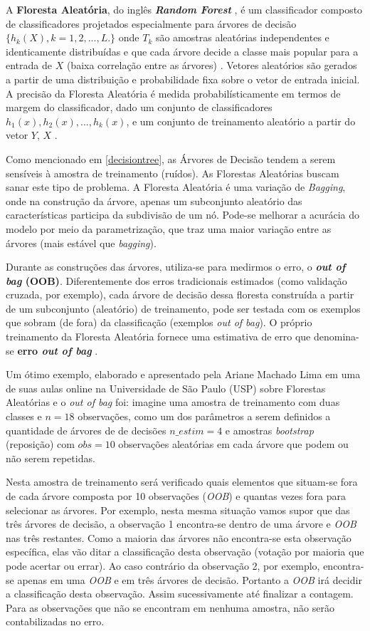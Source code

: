 \documentclass[
  openany]{book}
\begin{document}
A \textbf{Floresta Aleatória}, do inglês \textbf{\emph{Random Forest}} \citep{breiman2001random, liaw2002classification}, é um classificador composto de classificadores projetados especialmente para árvores de decisão \(\{h_k(X),k=1,2,...,L.\}\) onde \(T_k\) são amostras aleatórias independentes e identicamente distribuídas e que cada árvore decide a classe mais popular para a entrada de \(X\) (baixa correlação entre as árvores) . Vetores aleatórios são gerados a partir de uma distribuição e probabilidade fixa sobre o vetor de entrada inicial. A precisão da Floresta Aleatória é medida probabilísticamente em termos de margem do classificador, dado um conjunto de classificadores \(h_1(x), h_2(x),...,h_k(x)\), e um conjunto de treinamento aleatório a partir do vetor \(Y\), \(X\) \citep{gomez2012random}.

Como mencionado em \ref{decisiontree}, as Árvores de Decisão tendem a serem sensíveis à amostra de treinamento (ruídos). As Florestas Aleatórias buscam sanar este tipo de problema. A Floresta Aleatória é uma variação de \emph{Bagging}, onde na construção da árvore, apenas um subconjunto aleatório das características participa da subdivisão de um nó. Pode-se melhorar a acurácia do modelo por meio da parametrização, que traz uma maior variação entre as árvores (mais estável que \emph{bagging}).

Durante as construções das árvores, utiliza-se para medirmos o erro, o \textbf{\emph{out of bag} (OOB)}. Diferentemente dos erros tradicionais estimados (como validação cruzada, por exemplo), cada árvore de decisão dessa floresta construída a partir de um subconjunto (aleatório) de treinamento, pode ser testada com os exemplos que sobram (de fora) da classificação (exemplos \emph{out of bag}). O próprio treinamento da Floresta Aleatória fornece uma estimativa de erro que denomina-se \textbf{erro \emph{out of bag} }.

Um ótimo exemplo, elaborado e apresentado pela Ariane Machado Lima em uma de suas aulas online na Universidade de São Paulo (USP) sobre Florestas Aleatórias e o \emph{out of bag} foi: imagine uma amostra de treinamento com duas classes e \(n=18\) observações, como um dos parâmetros a serem definidos a quantidade de árvores de de decisões \(n\_estim=4\) e amostras \emph{bootstrap} (reposição) com \(obs=10\) observações aleatórias em cada árvore que podem ou não serem repetidas.

Nesta amostra de treinamento será verificado quais elementos que situam-se fora de cada árvore composta por 10 observações (\emph{OOB}) e quantas vezes fora para selecionar as árvores. Por exemplo, nesta mesma situação vamos supor que das três árvores de decisão, a observação 1 encontra-se dentro de uma árvore e \emph{OOB} nas três restantes. Como a maioria das árvores não encontra-se esta observação específica, elas vão ditar a classificação desta observação (votação por maioria que pode acertar ou errar). Ao caso contrário da observação 2, por exemplo, encontra-se apenas em uma \emph{OOB} e em três árvores de decisão. Portanto a \emph{OOB} irá decidir a classificação desta observação. Assim sucessivamente até finalizar a contagem. Para as observações que não se encontram em nenhuma amostra, não serão contabilizadas no erro.
\end{document}
